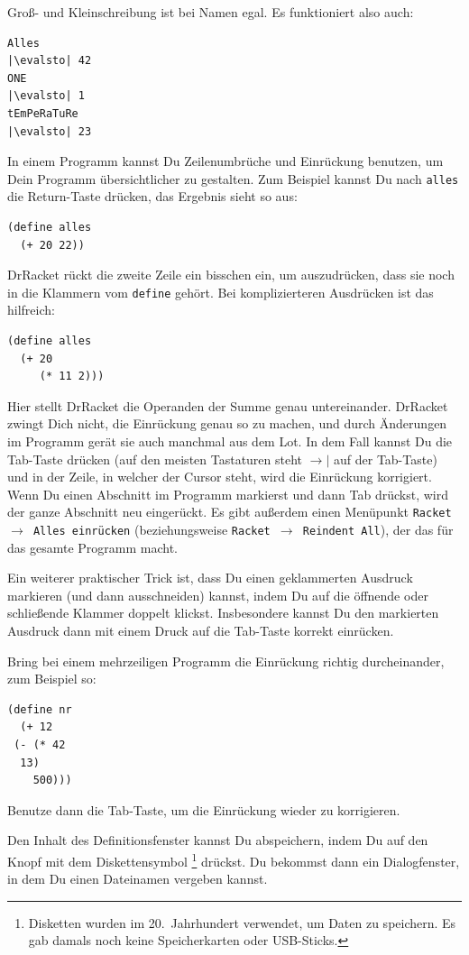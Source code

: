 Groß- und Kleinschreibung ist bei Namen egal.  Es funktioniert also
auch:
%
\begin{lstlisting}
Alles
|\evalsto| 42
ONE
|\evalsto| 1
tEmPeRaTuRe
|\evalsto| 23
\end{lstlisting}
%
In einem Programm kannst Du Zeilenumbrüche und Einrückung benutzen, um
Dein Programm übersichtlicher zu gestalten.  Zum Beispiel kannst Du
nach \lstinline{alles} die Return-Taste drücken, das Ergebnis sieht so
aus:
%
\begin{lstlisting}
(define alles
  (+ 20 22))
\end{lstlisting}
%
DrRacket rückt die zweite Zeile ein bisschen ein, um auszudrücken,
dass sie noch in die Klammern vom \lstinline{define} gehört.  Bei
komplizierteren Ausdrücken ist das hilfreich:
%
\begin{lstlisting}
(define alles
  (+ 20
     (* 11 2)))
\end{lstlisting}
%
Hier stellt DrRacket die Operanden der Summe genau untereinander.
DrRacket zwingt Dich nicht, die Einrückung genau so zu machen, und
durch Änderungen im Programm gerät sie auch manchmal aus dem Lot.  In
dem Fall kannst Du die Tab-Taste drücken (auf den meisten Tastaturen
steht $\longrightarrow\mid$ auf der Tab-Taste) und in der Zeile, in
welcher der Cursor steht, wird die Einrückung korrigiert.
Wenn Du einen Abschnitt im Programm markierst und dann Tab drückst,
wird der ganze Abschnitt neu eingerückt.  
Es gibt
außerdem einen Menüpunkt \texttt{Racket $\rightarrow$ Alles einrücken} (beziehungsweise
\texttt{Racket $\rightarrow$ Reindent All}), der das für das gesamte
Programm macht.

Ein weiterer praktischer Trick ist, dass Du einen geklammerten
Ausdruck markieren (und dann ausschneiden) kannst, indem Du auf die
öffnende oder schließende Klammer doppelt klickst.  Insbesondere
kannst Du den markierten Ausdruck dann mit einem Druck auf die
Tab-Taste korrekt einrücken.

\begin{aufgabeinline}
  Bring bei einem mehrzeiligen Programm die Einrückung richtig
  durcheinander, zum Beispiel so:
\begin{lstlisting}
(define nr
  (+ 12
 (- (* 42
  13)
    500)))
\end{lstlisting}
  Benutze dann die Tab-Taste, um die Einrückung wieder zu korrigieren.
\end{aufgabeinline}
%
Den Inhalt des Definitionsfenster kannst Du abspeichern, indem Du auf
den Knopf mit dem Diskettensymbol
\footnote{Disketten
wurden im 20.~Jahrhundert verwendet, um Daten zu speichern.  Es gab
damals noch keine Speicherkarten oder USB-Sticks.}
drückst.  Du bekommst dann ein Dialogfenster, in dem Du einen
Dateinamen vergeben kannst.

